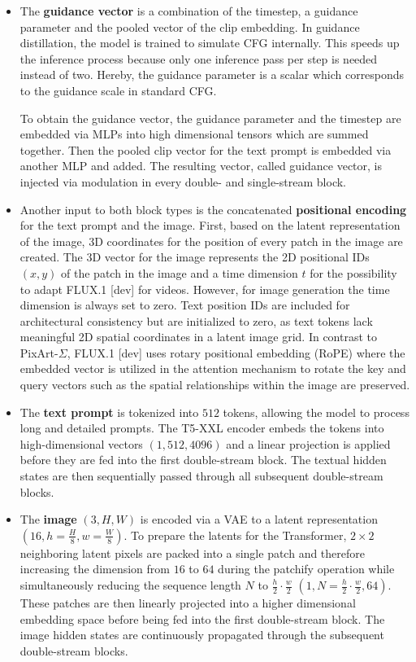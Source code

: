 \begin{itemize}

\item The \textbf{guidance vector} is a combination of the timestep, a guidance parameter and the pooled vector of the clip embedding. In guidance distillation, the model is trained to simulate \gls{CFG} internally. This speeds up the inference process because only one inference pass per step is needed instead of two. Hereby, the guidance parameter is a scalar which corresponds to the guidance scale in standard \gls{CFG}. 

 To obtain the guidance vector, the guidance parameter and the timestep are embedded via \gls{MLP}s  into high dimensional tensors which are summed together. Then the pooled clip vector for the text prompt is embedded via another MLP and added. The resulting vector, called guidance vector, is injected via modulation in every double- and single-stream block. 

\item Another input to both block types is the concatenated \textbf{positional encoding} for the text prompt and the image. First, based on the latent representation of the image, 3D coordinates for the position of every patch in the image are created. The 3D vector for the image represents the 2D positional IDs $(x,y)$ of the patch in the image and a time dimension $t$ for the possibility to adapt FLUX.1 {[dev]} for videos. However, for image generation the time dimension is always set to zero. Text position IDs are included for architectural consistency but are initialized to zero, as text tokens lack meaningful 2D spatial coordinates in a latent image grid. In contrast to PixArt-$\Sigma$, FLUX.1 {[dev]} uses rotary positional embedding (\gls{RoPE}) \cite{RoPE} where the embedded vector is utilized in the attention mechanism to rotate the key and query vectors such as the spatial relationships within the image are preserved.

\item The \textbf{text prompt} is tokenized into $512$ tokens, allowing the model to process long and detailed prompts. The T5-XXL encoder embeds the tokens into high-dimensional vectors $(1,512,4096)$ and a linear projection is applied before they are fed into the first double-stream block. The textual hidden states are then sequentially passed through all subsequent double-stream blocks. 

\item The \textbf{image} $(3,H,W)$ is encoded via a \gls{VAE} to a latent representation $(16,h=\frac{H}{8}, w=\frac{W}{8})$. To prepare the latents for the Transformer, $2 \times 2$ neighboring latent pixels are packed into a single patch and therefore increasing the dimension from $16$ to $64$ during the patchify operation while simultaneously reducing the sequence length $N$ to $\frac{h}{2} \cdot \frac{w}{2}$ $(1,N=\frac{h}{2} \cdot \frac{w}{2}, 64)$. These patches are then linearly projected into a higher dimensional embedding space before being fed into the first double-stream block. The image hidden states are continuously propagated through the subsequent double-stream blocks.

\end{itemize}

